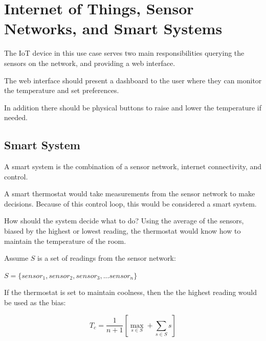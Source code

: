 \documentclass[10pt, journal]{IEEEtran} %
\begin{document}




\section{Internet of Things, Sensor Networks, and Smart Systems}

The IoT device in this use case serves two main responsibilities 
querying the sensors on the network, and providing a web interface.

The web interface should present a dashboard to the user where they can
monitor the temperature and set preferences.

In addition there should be physical buttons to raise and lower the temperature if needed.

\subsection{Smart System}

A smart system is the combination of a sensor network, internet connectivity, and control.

A smart thermostat would take measurements from the sensor network to make decisions.
Because of this control loop, this would be considered a smart system.

How should the system decide what to do? 
Using the average of the sensors, biased by the highest or lowest reading,
the thermostat would know how to maintain the temperature of the room.


Assume $S$ is a set of readings from the sensor network:

$S = \{sensor_1, sensor_2, sensor_3, ...sensor_n\}$

\bigskip

If the thermostat is set to maintain coolness,
then the the highest reading would be used as the bias:

\[
T_c = \frac{1}{n+1}\left[ \max_{s \in S} + \sum_{s \in S}{s} \right]
\]

\smallskip
\end{document}
